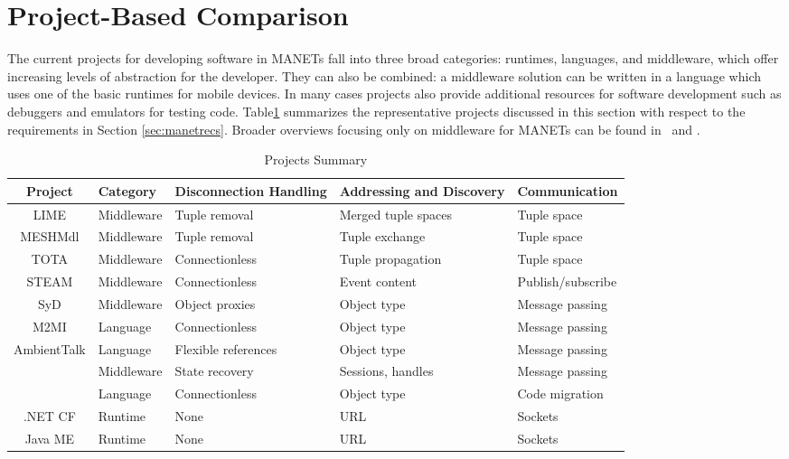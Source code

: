 \section{Project-Based Comparison}\label{sec:proj_eval}

The current projects for developing software in MANETs fall into three broad categories: runtimes, languages, and middleware, which offer increasing levels of abstraction for the developer. They can also be combined: a middleware solution can be written in a language which uses one of the basic runtimes for mobile devices. In many cases projects also provide additional resources for software development such as debuggers and emulators for testing code. Table\ref{table:projs} summarizes the representative projects discussed in this section with respect to the requirements in Section \ref{sec:manetrecs}. Broader overviews focusing only on middleware for MANETs can be found in~\cite{middlewaresurvey} and \cite{newmiddlewaresurvey}.

\begin{table}
\centering
\caption{Projects Summary}
\begin{tabular}{|c|p{2cm}|p{3cm}|p{4cm}|p{3.5cm}|} \hline
\textbf{Project} & \textbf{Category} & \textbf{Disconnection Handling} & \textbf{Addressing and Discovery} & \textbf{Communication} \\ \hline
LIME & Middleware & Tuple removal & Merged tuple spaces & Tuple space \\ \hline
MESHMdl & Middleware & Tuple removal & Tuple exchange & Tuple space \\ \hline
TOTA & Middleware & Connectionless & Tuple propagation & Tuple space \\ \hline
STEAM & Middleware  & Connectionless & Event content & Publish/subscribe \\ \hline
SyD & Middleware &  Object proxies &  Object type & Message passing \\ \hline
M2MI & Language & Connectionless &  Object type & Message passing \\ \hline
AmbientTalk & Language &  Flexible references &  Object type & Message passing \\ \hline

SpatialViews & Language & Connectionless & Object type & Code migration \\ \hline
.NET CF & Runtime &  None & URL & Sockets \\ \hline
Java ME & Runtime & None & URL & Sockets \\ \hline
\end{tabular}
\label{table:projs}
\end{table}

